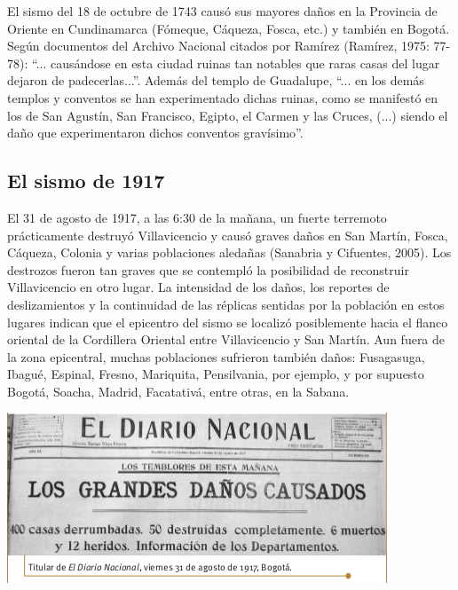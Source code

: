 \documentclass[10pt,twoside]{article}
\begin{document}
\begin{multicols}{2}
El sismo del 18 de octubre de 1743 causó sus mayores daños en la Provincia de Oriente en Cundinamarca (Fómeque, Cáqueza, Fosca, etc.) y también en Bogotá. Según documentos del Archivo
Nacional citados por Ramírez (Ramírez, 1975: 77-78): “... causándose en esta ciudad ruinas tan notables que raras casas
del lugar dejaron de padecerlas...”. Además del templo de Guadalupe, “... en los demás templos y conventos se han experimentado dichas ruinas, como se manifestó en los de San Agustín, San Francisco, Egipto, el Carmen y las Cruces, (...) siendo el daño que experimentaron dichos conventos gravísimo”.
\subsection*{El sismo de 1917}
El 31 de agosto de 1917, a las 6:30 de la mañana, un fuerte terremoto prácticamente destruyó Villavicencio y causó graves daños en San Martín, Fosca, Cáqueza, Colonia y varias poblaciones aledañas (Sanabria y Cifuentes, 2005). Los destrozos fueron tan graves que se contempló la posibilidad de reconstruir Villavicencio en otro lugar. La intensidad de los daños, los reportes de deslizamientos y la continuidad de las réplicas sentidas por la población en estos lugares indican que el epicentro del sismo se localizó posiblemente hacia el flanco oriental de la Cordillera Oriental entre Villavicencio y San Martín. Aun fuera de la zona epicentral, muchas poblaciones sufrieron también daños: Fusagasuga, Ibagué, Espinal, Fresno, Mariquita, Pensilvania, por ejemplo, y por supuesto Bogotá, Soacha, Madrid, Facatativá, entre otras, en la Sabana.

\includegraphics[scale=.56]{Images/Pantallazo51.png} 


\end{multicols}
\end{document}
